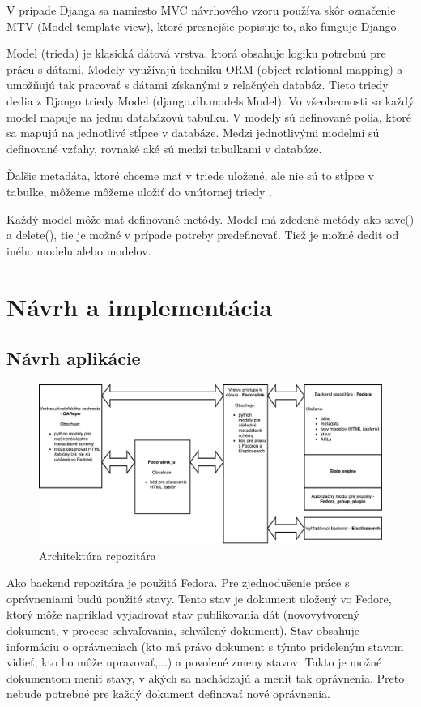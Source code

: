 \documentclass[thesis=M,slovak]{FITthesis}[2013/05/06]
\begin{document}
V prípade Djanga sa namiesto MVC návrhového vzoru používa skôr označenie MTV (Model-template-view), ktoré presnejšie popisuje to, ako funguje Django. \cite{DjangoFAQ}

\label{datovaVrstva}Model (trieda) je klasická dátová vrstva, ktorá obsahuje logiku potrebnú pre prácu s dátami. Modely využívajú techniku ORM (object-relational mapping) a umožňujú tak pracovať s dátami získanými z relačných databáz. Tieto triedy dedia z Django triedy Model (django.db.models.Model). Vo všeobecnosti sa každý model mapuje na jednu databázovú tabuľku. V modely sú definované polia, ktoré sa mapujú na jednotlivé stĺpce v databáze. Medzi jednotlivými modelmi sú definované vzťahy, rovnaké aké sú medzi tabuľkami v databáze.

Ďalšie metadáta, ktoré chceme mať v triede uložené, ale nie sú to stĺpce v tabuľke, môžeme môžeme uložiť do vnútornej triedy . 

Každý model môže mať definované metódy. Model má zdedené metódy ako save() a delete(), tie je možné v prípade potreby predefinovať. Tiež je možné dediť od iného modelu alebo modelov. \cite{DjangoModels}

\chapter{Návrh a implementácia}
\section{Návrh aplikácie}
\begin{figure}\centering
	\includegraphics[width=1.0\textwidth]{diagramy/Architektura_repozitara.pdf}
 	\caption[Architektúra repozitára]{Architektúra repozitára}\label{graphics:architektura_repozitara}
\end{figure}

Ako backend repozitára je použitá Fedora. Pre zjednodušenie práce s oprávneniami budú použité stavy. Tento stav je dokument uložený vo Fedore, ktorý môže napríklad vyjadrovať stav publikovania dát (novovytvorený dokument, v procese schvaľovania, schválený dokument). Stav obsahuje informáciu o oprávneniach (kto má právo dokument s týmto prideleným stavom vidieť, kto ho môže upravovať,...) a povolené zmeny stavov. Takto je možné dokumentom meniť stavy, v akých sa nachádzajú a meniť tak oprávnenia. Preto nebude potrebné pre každý dokument definovať nové oprávnenia.
\end{document}
